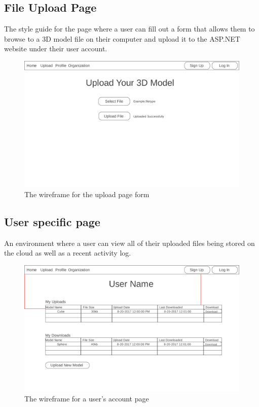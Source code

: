 \newpage
\subsection{File Upload Page}
    \hspace{7mm} The style guide for the page where a user can fill out a form 
    that allows them to browse to a 3D model file on their computer and upload
    it to the ASP.NET website under their user account.
    \ \\
    \label{fig:proto_web_upload}
    \begin{figure}[H]
        \centering \includegraphics[width=0.6\linewidth]{Upload}
        \caption{The wireframe for the upload page form}
    \end{figure}

\subsection{User specific page}
    \hspace{7mm}
    An environment where a user can view all of their uploaded files being stored 
    on the cloud as well as a recent activity log.
    \ \\
    \label{fig:proto_web_user_page}
    \begin{figure}[H]
        \centering \includegraphics[width=0.6\linewidth]{UserPage}
        \caption{The wireframe for a user's account page}
    \end{figure}

\newpage

